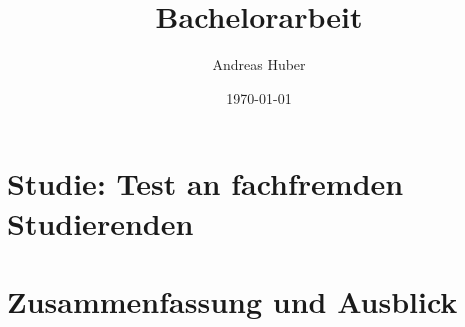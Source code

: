 \documentclass[a4paper,12pt]{article}
\title{Bachelorarbeit}
\author{Andreas Huber}
\date{\today}
\begin{document}

\newpage


\tableofcontents
\newpage






\newpage


\newpage


\section{Studie: Test an fachfremden Studierenden}\label{studie}
\section{Zusammenfassung und Ausblick}\label{zusammenfassung-u-ausblick}
\newpage

\setcounter{page}{3}


\newpage


\newpage
\end{document}

